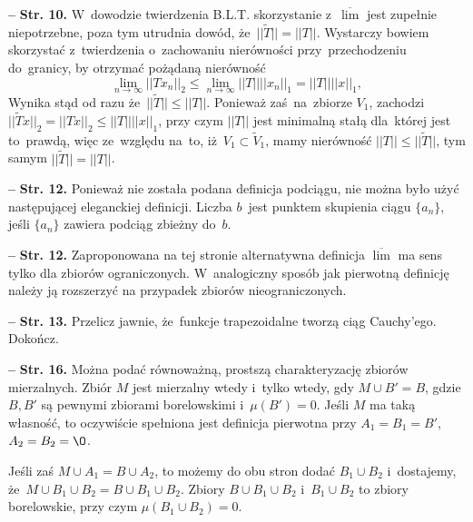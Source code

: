 \documentclass[a4paper,11pt]{article}
\newcommand{\spaceFour}{0.5em}
\newcommand{\tb}{\textbf}
\newcommand{\noi}{\noindent}
\newcommand{\tb}{\textbf}
\newcommand{\noi}{\noindent}
\newcommand{\start}{\noi \tb{--} {}}
\newcommand{\Str}[1]{\tb{Str. #1.}}
\newcommand{\ol}{\overline}
\newcommand{\wt}{\widetilde}
\newcommand{\ra}{\rightarrow}
\newcommand{\wtw}{wtedy i~tylko wtedy}
\newcommand{\norm}[1]{\left|\left| #1 \right|\right|}
\newcommand{\Lim}{\lim\limits}
\newcommand{\Limsup}{\ol{\lim}}
\newcommand{\Dok}{{\color{red} Dokończ.}}
\begin{document}
\start \Str{10} W~dowodzie twierdzenia B.L.T. skorzystanie z~$\Limsup$
jest zupełnie niepotrzebne, poza tym utrudnia dowód,
że~$|| \tilde{ T } || = \norm{ T }$. Wystarczy bowiem skorzystać
z~twierdzenia o~zachowaniu nierówności przy~przechodzeniu do~granicy,
by otrzymać pożądaną nierówność
\begin{equation*}
  \Lim_{ n \ra \infty } \norm{ T x_{ n } }_{ 2 }
  \leq \Lim_{ n \ra \infty } \norm{ T } \norm{ x_{ n } }_{ 1 }
  = \norm{ T } \norm{ x }_{ 1 },
\end{equation*}
Wynika stąd od razu że~$|| \wt{ T } || \leq \norm{ T }$. Ponieważ
zaś~na~zbiorze $V_{ 1 }$, zachodzi
$|| \wt{ T } x ||_{ 2 } = \norm{ T x }_{ 2 } \leq \norm{ T } \norm{ x
}_{ 1 }$, przy czym $\norm{ T }$ jest minimalną stałą dla~której jest
to~prawdą, więc ze~względu na~to, iż~$V_{ 1 } \subset \wt{ V }_{ 1 }$,
mamy nierówność $\norm{ T } \leq || \wt{ T } ||$, tym samym
$|| \wt{ T } || = \norm{ T }$. %

\vspace{\spaceFour}


\start \Str{12} Ponieważ nie została podana definicja podciągu, nie
można było użyć następującej eleganckiej definicji. Liczba $b$~jest
punktem skupienia ciągu $\{ a_{ n } \}$, jeśli $\{ a_{ n } \}$ zawiera
podciąg zbieżny do~$b$. %

\vspace{\spaceFour}


\start \Str{12} Zaproponowana na tej stronie alternatywna definicja
$\Limsup$ ma sens tylko dla zbiorów ograniczonych. W~analogiczny
sposób jak pierwotną definicję należy ją rozszerzyć na przypadek
zbiorów nieograniczonych. %

\vspace{\spaceFour}


\start \Str{13} Przelicz jawnie, że~funkcje trapezoidalne tworzą ciąg
Cauchy'ego. \Dok

\vspace{\spaceFour}


\start \Str{16} Można podać równoważną, prostszą charakteryzację
zbiorów mierzalnych. Zbiór $M$ jest mierzalny \wtw, gdy
$M \cup B' = B$, gdzie $B, B'$ są pewnymi zbiorami borelowskimi
i~$\mu( B' ) = 0$. Jeśli $M$ ma taką własność, to oczywiście spełniona
jest definicja pierwotna przy $A_{ 1 } = B_{ 1 } = B'$,
$A_{ 2 } = B_{ 2 } = \O$.

Jeśli zaś $M \cup A_{ 1 } = B \cup A_{ 2 }$, to możemy do obu stron
dodać $B_{ 1 } \cup B_{ 2 }$ i~dostajemy,
że~$M \cup B_{ 1 } \cup B_{ 2 } = B \cup B_{ 1 } \cup B_{ 2 }$. Zbiory
$B \cup B_{ 1 } \cup B_{ 2 }$ i~$B_{ 1 } \cup B_{ 2 }$ to zbiory
borelowskie, przy czym $\mu( B_{ 1 } \cup B_{ 2 } ) = 0$.
\end{document}
